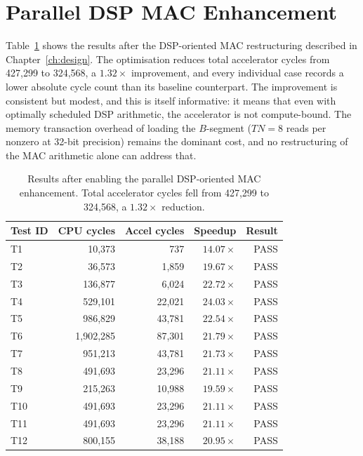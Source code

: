\section{Parallel DSP MAC Enhancement}

Table~\ref{tab:dsp-results} shows the results after the DSP-oriented MAC
restructuring described in Chapter~\ref{ch:design}. The optimisation
reduces total accelerator cycles from 427,299 to 324,568, a $1.32\times$
improvement, and every individual case records a lower absolute cycle
count than its baseline counterpart. The improvement is consistent but
modest, and this is itself informative: it means that even with
optimally scheduled DSP arithmetic, the accelerator is not
compute-bound. The memory transaction overhead of loading the
$B$-segment ($TN = 8$ reads per nonzero at 32-bit precision) remains
the dominant cost, and no restructuring of the MAC arithmetic alone can
address that.

\begin{table}[htbp]
  \centering
  \small
  \begin{tabular}{lrrrr}
  \toprule
  Test ID & CPU cycles & Accel cycles & Speedup & Result \\
  \midrule
  T1  & 10,373   &    737 & $14.07\times$ & PASS \\
  T2  & 36,573   &  1,859 & $19.67\times$ & PASS \\
  T3  & 136,877  &  6,024 & $22.72\times$ & PASS \\
  T4  & 529,101  & 22,021 & $24.03\times$ & PASS \\
  T5  & 986,829  & 43,781 & $22.54\times$ & PASS \\
  T6  & 1,902,285 & 87,301 & $21.79\times$ & PASS \\
  T7  & 951,213  & 43,781 & $21.73\times$ & PASS \\
  T8  & 491,693  & 23,296 & $21.11\times$ & PASS \\
  T9  & 215,263  & 10,988 & $19.59\times$ & PASS \\
  T10 & 491,693  & 23,296 & $21.11\times$ & PASS \\
  T11 & 491,693  & 23,296 & $21.11\times$ & PASS \\
  T12 & 800,155  & 38,188 & $20.95\times$ & PASS \\
  \bottomrule
  \end{tabular}
  \caption{Results after enabling the parallel DSP-oriented MAC
           enhancement. Total accelerator cycles fell from 427,299 to
           324,568, a $1.32\times$ reduction.}
  \label{tab:dsp-results}
\end{table}

